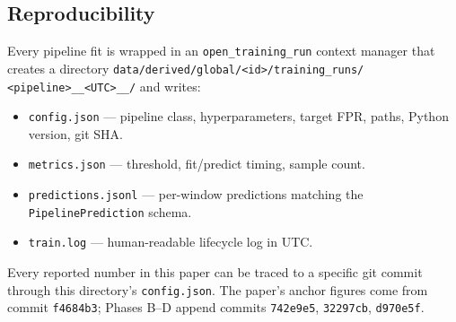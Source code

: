 \subsection{Reproducibility}

Every pipeline fit is wrapped in an \texttt{open\_training\_run} context manager that creates a directory \texttt{data/derived/global/<id>/training\_runs/\,<pipeline>\_\_<UTC>\_\_<sha8>/} and writes:

\begin{itemize}
    \item \texttt{config.json} --- pipeline class, hyperparameters, target FPR, paths, Python version, git SHA.
    \item \texttt{metrics.json} --- threshold, fit/predict timing, sample count.
    \item \texttt{predictions.jsonl} --- per-window predictions matching the \texttt{PipelinePrediction} schema.
    \item \texttt{train.log} --- human-readable lifecycle log in UTC.
\end{itemize}

Every reported number in this paper can be traced to a specific git commit through this directory's \texttt{config.json}. The paper's anchor figures come from commit \texttt{f4684b3}; Phases B--D append commits \texttt{742e9e5}, \texttt{32297cb}, \texttt{d970e5f}.
